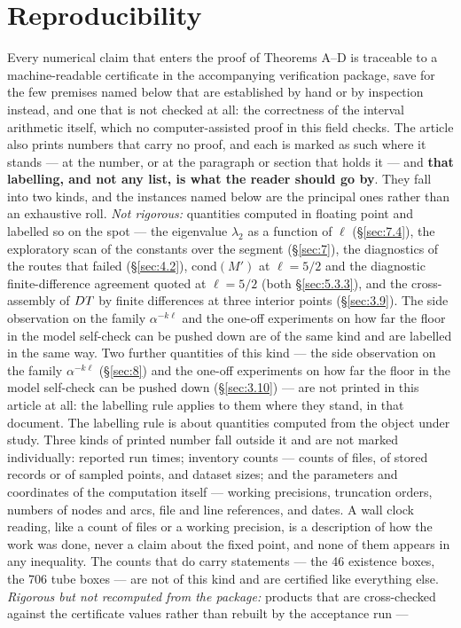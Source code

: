 
\section*{Reproducibility}

Every numerical claim that enters the proof of Theorems A--D is traceable to a
machine-readable certificate in the accompanying verification package, save for
the few premises named below that are established by hand or by inspection
instead, and one that is not checked at all: the correctness of the interval
arithmetic itself, which no computer-assisted proof in this field checks. The
article also prints numbers that carry no proof, and each is marked as such
where it stands --- at the number, or at the paragraph or section that holds it
--- and \textbf{that labelling, and not any list, is what the
reader should go by}. They fall into two kinds, and the instances named below
are the principal ones rather than an exhaustive roll.
\emph{Not rigorous:} quantities
computed in floating point and labelled so on the spot --- the eigenvalue
$\lambda_{2}$ as a function of $\ell$ (\S\ref{sec:7.4}), the exploratory scan
of the constants over the segment (\S\ref{sec:7}), the diagnostics of the
routes that failed (\S\ref{sec:4.2}), $\mathrm{cond}(M')$ at $\ell = 5/2$ and
the diagnostic finite-difference agreement quoted at $\ell = 5/2$ (both
\S\ref{sec:5.3.3}), and the
cross-assembly of $DT$ by finite differences at three interior points
(\S\ref{sec:3.9}).
\ifx\JOURNALVERSION\undefined
The side observation on the family $\alpha^{-k\ell}$ and the one-off
experiments on how far the floor in the model self-check can be pushed down are
of the same kind and are labelled in the same way.
\else
Two further quantities of this kind --- the side observation on the family
$\alpha^{-k\ell}$ (\S\ref{sec:8}) and the one-off experiments on how far the
floor in the model self-check can be pushed down (\S\ref{sec:3.10}) --- are not
printed in this article at all: the labelling rule applies to them where they
stand, in that document.
\fi
The labelling rule is about quantities computed from the object under study.
Three kinds of printed number fall outside it and are not marked individually:
reported run times; inventory counts --- counts of files, of stored records or
of sampled points, and dataset sizes; and the parameters and coordinates of the
computation itself --- working precisions, truncation orders, numbers of nodes
and arcs, file and line references, and dates. A wall clock reading, like a
count of files or a working precision, is a description of how the work was
done, never a claim about the fixed point, and none of them appears in any
inequality. The counts that do carry statements --- the 46 existence boxes, the
706 tube boxes --- are not of this kind and are certified like everything else.
\emph{Rigorous but not recomputed from the package:} products that are
cross-checked against the certificate values rather than rebuilt by the
acceptance run --- \notrecomputedroll{}

